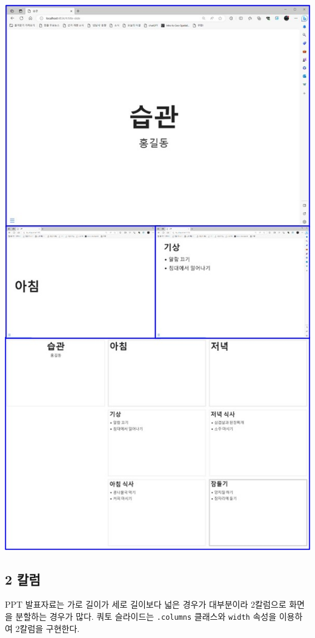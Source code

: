 \documentclass[
  letterpaper,
]{book}
\begin{document}
\includegraphics{images/revealjs_create.jpg}

\hypertarget{uxce7cuxb7fc}{%
\subsection{2 칼럼}\label{uxce7cuxb7fc}}

PPT 발표자료는 가로 길이가 세로 길이보다 넓은 경우가 대부분이라
2칼럼으로 화면을 분할하는 경우가 많다. 쿼토 슬라이드는 \texttt{.columns}
클래스와 \texttt{width} 속성을 이용하여 2칼럼을 구현한다.
\end{document}
